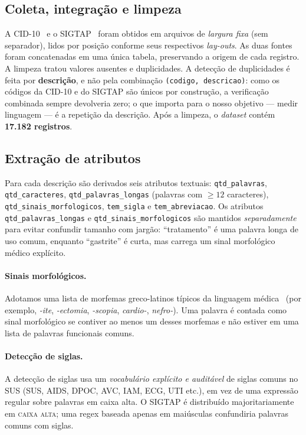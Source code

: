 \documentclass[12pt]{article}
\begin{document}
\subsection{Coleta, integração e limpeza}

A CID-10~\cite{datasus_cid10} e o SIGTAP~\cite{datasus_sigtap} foram obtidos
em arquivos de \textit{largura fixa} (sem separador), lidos por posição
conforme seus respectivos \textit{lay-outs}. As duas fontes foram
concatenadas em uma única tabela, preservando a origem de cada registro.
A limpeza tratou valores ausentes e duplicidades. A detecção de duplicidades
é feita por \textbf{descrição}, e não pela combinação \texttt{(codigo,
descricao)}: como os códigos da CID-10 e do SIGTAP são únicos por
construção, a verificação combinada sempre devolveria zero; o que importa
para o nosso objetivo --- medir linguagem --- é a repetição da descrição.
Após a limpeza, o \textit{dataset} contém \textbf{17.182 registros}.

\subsection{Extração de atributos}

Para cada descrição são derivados seis atributos textuais:
\texttt{qtd\_palavras}, \texttt{qtd\_caracteres}, \texttt{qtd\_palavras\_longas}
(palavras com $\geq 12$ caracteres), \texttt{qtd\_sinais\_morfologicos},
\texttt{tem\_sigla} e \texttt{tem\_abreviacao}. Os atributos
\texttt{qtd\_palavras\_longas} e \texttt{qtd\_sinais\_morfologicos} são
mantidos \emph{separadamente} para evitar confundir tamanho com jargão:
``tratamento'' é uma palavra longa de uso comum, enquanto ``gastrite''
é curta, mas carrega um sinal morfológico médico explícito.

\paragraph{Sinais morfológicos.} Adotamos uma lista de morfemas
greco-latinos típicos da linguagem médica~\cite{rezende2004} (por exemplo,
\textit{-ite}, \textit{-ectomia}, \textit{-scopia}, \textit{cardio-},
\textit{nefro-}). Uma palavra é contada como sinal morfológico se contiver
ao menos um desses morfemas e não estiver em uma lista de palavras
funcionais comuns.

\paragraph{Detecção de siglas.} A detecção de siglas usa um
\emph{vocabulário explícito e auditável} de siglas comuns no SUS (SUS, AIDS,
DPOC, AVC, IAM, ECG, UTI etc.), em vez de uma expressão regular sobre
palavras em caixa alta. O SIGTAP é distribuído majoritariamente em
\textsc{caixa alta}; uma regex baseada apenas em maiúsculas confundiria
palavras comuns com siglas.
\end{document}
